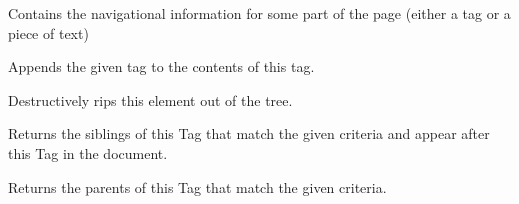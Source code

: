\documentclass[letterpaper,10pt,english]{sphinxmanual}
\begin{document}
\begin{fulllineitems}
\label{SamPy.parsing:SamPy.parsing.BeautifulSoup.PageElement}
Contains the navigational information for some part of the page
(either a tag or a piece of text)


\begin{fulllineitems}
\label{SamPy.parsing:SamPy.parsing.BeautifulSoup.PageElement.append}
Appends the given tag to the contents of this tag.

\end{fulllineitems}



\begin{fulllineitems}
\label{SamPy.parsing:SamPy.parsing.BeautifulSoup.PageElement.extract}
Destructively rips this element out of the tree.

\end{fulllineitems}



\begin{fulllineitems}
\label{SamPy.parsing:SamPy.parsing.BeautifulSoup.PageElement.fetchNextSiblings}
Returns the siblings of this Tag that match the given
criteria and appear after this Tag in the document.

\end{fulllineitems}



\begin{fulllineitems}
\label{SamPy.parsing:SamPy.parsing.BeautifulSoup.PageElement.fetchParents}
Returns the parents of this Tag that match the given
criteria.

\end{fulllineitems}



\end{fulllineitems}
\end{document}
